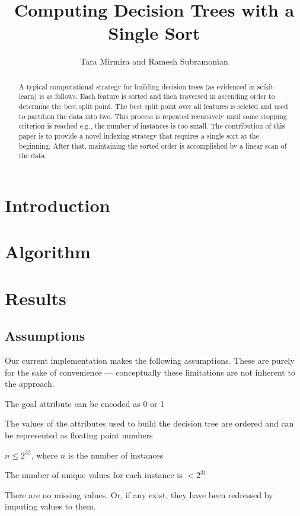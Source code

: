 \documentclass[12pt,letterpaper]{article}
\begin{document}
\title{Computing Decision Trees with a Single Sort}
\author{Tara Mirmira and Ramesh Subramonian}
\maketitle
\thispagestyle{fancy}
\lhead{}
\chead{}
\rhead{}
\lfoot{}
\rfoot{{\small \thepage}}

\begin{abstract}
A typical computational strategy for building decision trees (as evidenced in
  scikit-learn) is as follows. Each feature is sorted and then traversed in
  ascending order to determine the best split point. The best split point over
  all features is selcted and used to partition the data into two. This
  process is repeated recursively until some stopping criterion is reached e.g.,
  the number of instances is
  too small. The contribution of this paper is to provide a novel indexing
  strategy that requires a single sort at the beginning. After that, maintaining
  the sorted order is accomplished by a linear scan of the data.
\end{abstract}

\section{Introduction}


\section{Algorithm}

\section{Results}

\subsection{Assumptions}
Our current implementation makes the following assumptions. These are purely for
the sake of convenience --- conceptually these limitations are not inherent to
the approach.

\be
\item The goal attribute can be encoded as 0 or 1
\item The values of the attributes used to build the decision tree are ordered and can be
  represented as floating point numbers
\item \(n \leq 2^{32}\), where \(n\) is the number of instances
\item The number of unique values for each instance is \(< 2^{31}\)
\item There are no missing values. Or, if any exist, they have been redressed
  by imputing values to them. 
\ee
\end{document}
